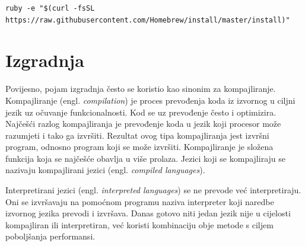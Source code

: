 \documentclass[times, utf8, diplomski, numeric]{fer}
\newcommand{\eng}[1]{(engl. \textit{#1})}
\begin{document}
\begin{lstlisting}[caption=Instalacija Homebrew alata, label=listing:homebrew]
ruby -e "$(curl -fsSL https://raw.githubusercontent.com/Homebrew/install/master/install)"
\end{lstlisting}

\section{Izgradnja} \label{header:Izgradnja}

Povijesno, pojam izgradnja često se koristio kao sinonim za kompajliranje. Kompajliranje \eng{compilation} je proces prevođenja koda iz izvornog u ciljni jezik uz očuvanje funkcionalnosti. Kod se uz prevođenje često i optimizira. Najčešći razlog kompajliranja je prevođenje koda u jezik koji procesor može razumjeti i tako ga izvršiti. Rezultat ovog tipa kompajliranja jest izvršni program, odnosno program koji se može izvršiti. Kompajliranje je složena funkcija koja se najčešće obavlja u više prolaza. Jezici koji se kompajliraju se nazivaju kompajlirani jezici \eng{compiled languages}.

Interpretirani jezici \eng{interpreted languages} se ne prevode već interpretiraju. Oni se izvršavaju na pomoćnom programu naziva interpreter koji naredbe izvornog jezika prevodi i izvršava. Danas gotovo niti jedan jezik nije u cijelosti kompajliran ili interpretiran, već koristi kombinaciju obje metode s ciljem poboljšanja performansi.
\end{document}
